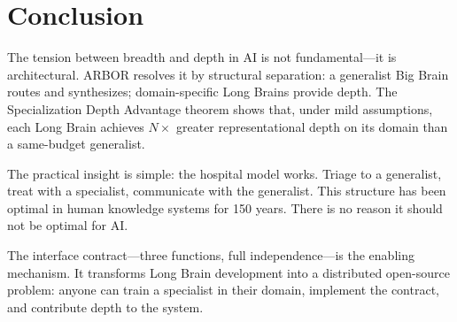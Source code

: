 \documentclass[12pt]{article}
\begin{document}
\section{Conclusion}

The tension between breadth and depth in AI is not fundamental---it is architectural. ARBOR resolves it by structural separation: a generalist Big Brain routes and synthesizes; domain-specific Long Brains provide depth. The Specialization Depth Advantage theorem shows that, under mild assumptions, each Long Brain achieves $N\times$ greater representational depth on its domain than a same-budget generalist.

The practical insight is simple: the hospital model works. Triage to a generalist, treat with a specialist, communicate with the generalist. This structure has been optimal in human knowledge systems for 150 years. There is no reason it should not be optimal for AI.

The interface contract---three functions, full independence---is the enabling mechanism. It transforms Long Brain development into a distributed open-source problem: anyone can train a specialist in their domain, implement the contract, and contribute depth to the system.
\end{document}

